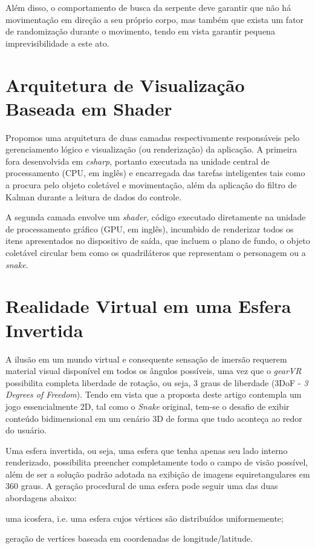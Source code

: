 \documentclass{vgtc}                          %
\begin{document}
Além disso, o comportamento de busca da serpente deve garantir que não há movimentação em direção a seu próprio corpo, mas também que exista um fator de randomização durante o movimento, tendo em vista garantir pequena imprevisibilidade a este ato.

\section{Arquitetura de Visualização Baseada em Shader} \label{sec:architecture}
Propomos uma arquitetura de duas camadas respectivamente responsáveis pelo gerenciamento lógico e visualização (ou renderização) da aplicação. A primeira fora desenvolvida em \textit{csharp}, portanto executada na unidade central de processamento (CPU, em inglês) e encarregada das tarefas inteligentes tais como a procura pelo objeto coletável e movimentação, além da aplicação do filtro de Kalman durante a leitura de dados do controle.

A segunda camada envolve um \textit{shader}, código executado diretamente na unidade de processamento gráfico (GPU, em inglês), incumbido de renderizar todos os itens apresentados no dispositivo de saída, que incluem o plano de fundo, o objeto coletável circular bem como os quadriláteros que representam o personagem ou a \textit{snake}.

\section{Realidade Virtual em uma Esfera Invertida} \label{sec:invertedsphere}

A ilusão em um mundo virtual e consequente sensação de imersão requerem material visual disponível em todos os ângulos possíveis, uma vez que o \textit{gearVR} possibilita completa liberdade de rotação, ou seja, 3 graus de liberdade (3DoF - \textit{3 Degrees of Freedom}). Tendo em vista que a proposta deste artigo contempla um jogo essencialmente 2D, tal como o \textit{Snake} original, tem-se o desafio de exibir conteúdo bidimensional em um cenário 3D de forma que tudo aconteça ao redor do usuário.

Uma esfera invertida, ou seja, uma esfera que tenha apenas seu lado interno renderizado, possibilita preencher completamente todo o campo de visão possível, além de ser a solução padrão adotada na exibição de imagens equiretangulares em 360 graus. A geração procedural de uma esfera pode seguir uma das duas abordagens abaixo:
\begin{enumerate}
  \begin{item} uma icosfera, i.e. uma esfera cujos vértices são distribuídos uniformemente; \end{item}
  \begin{item} geração de vertíces baseada em coordenadas de longitude/latitude. \end{item}
\end{enumerate}
\end{document}
